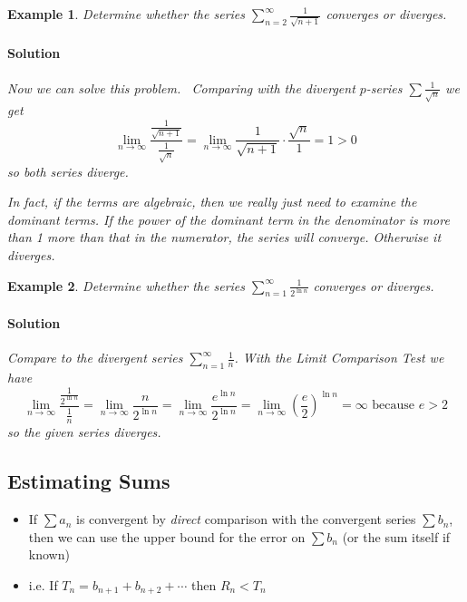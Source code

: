\documentclass[letterpaper, 11pt, openany]{book}
\theoremstyle{mytheoremstyle}
\theoremstyle{myexamplestyle}
\newtheorem{example}{Example}[section]
\newenvironment{solution}{\paragraph{\sffamily \smaller \fontseries{b}\selectfont Solution}}{\hfill\faSquare}
\begin{document}
\begin{example}\label{e:seriescomptestdirectsqrt}
     Determine whether the series $\displaystyle \sum_{n=2}^{\infty} \frac{1}{\sqrt{n + 1}}$ converges or diverges.
    
    \begin{solution}
         Now we can solve this problem. \faSmile \ Comparing with the divergent $p$-series $\sum \frac{1}{\sqrt{n}}$ we get
         \[\lim_{n \to \infty}  \frac{\frac{1}{\sqrt{n + 1}}}{\frac{1}{\sqrt{n}}} = \lim_{n \to \infty} \frac{1}{\sqrt{n + 1}} \cdot \frac{\sqrt{n}}{1} = 1 > 0 \]
         so both series diverge. \faThumbsUp
    
         In fact, if the terms are algebraic, then we really just need to examine the dominant terms. If the power of the dominant term in the denominator is more than 1 more than that in the numerator, the series will converge. Otherwise it diverges.
    \end{solution}
\end{example}

\begin{example}\label{e:seriescomptestdirectln}
    Determine whether the series $\displaystyle \sum_{n=1}^{\infty} \frac{1}{2^{\ln n}}$ converges or diverges.
    
    \begin{solution}
        Compare to the divergent series $\sum_{n = 1}^{\infty} \frac{1}{n}$. With the Limit Comparison Test we have
        \[\lim_{n \to \infty} \frac{\frac{1}{2^{\ln n}}}{\frac{1}{n}} = \lim_{n \to \infty} \frac{n}{2^{\ln n}} = \lim_{n \to \infty} \frac{e^{\ln n }}{2^{\ln n}} = \lim_{n \to \infty} \left( \frac{e}{2} \right)^{\ln n} = \infty \text{ because } e > 2\]
        so the given series diverges.
    \end{solution}
\end{example}

\subsection{Estimating Sums}
\begin{itemize}
    \item If $\sum a_{n}$ is convergent by \textit{direct} comparison with the convergent series $\sum b_{n}$, then we can use the upper bound for the error on $\sum b_{n}$ (or the sum itself if known)
    \item i.e. If $T_{n} = b_{n+ 1} + b_{n + 2} + \cdots$ then $R_{n} < T_{n}$
\end{itemize}
\end{document}
